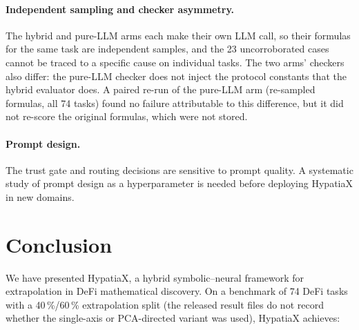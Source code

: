 \documentclass[twoside,11pt]{article}
\begin{document}
\paragraph{Independent sampling and checker asymmetry.}
The hybrid and pure-LLM arms each make their own LLM call, so their formulas
for the same task are independent samples, and the 23 uncorroborated cases
cannot be traced to a specific cause on individual tasks. The two arms' checkers also differ:
the pure-LLM checker does not inject the protocol constants that the hybrid
evaluator does. A paired re-run of the pure-LLM arm (re-sampled formulas, all
74 tasks) found no failure attributable to this difference, but it did not
re-score the original formulas, which were not stored.

\paragraph{Prompt design.}
The trust gate and routing decisions are sensitive to prompt quality.  A systematic
study of prompt design as a hyperparameter is needed before deploying HypatiaX
in new domains.

\section{Conclusion}
\label{sec:conclusion}

We have presented HypatiaX, a hybrid symbolic--neural framework for extrapolation
in DeFi mathematical discovery.  On a benchmark of 74 DeFi tasks with a 40\,\%/60\,\% extrapolation split (the released result files do not record whether the single-axis or PCA-directed variant was used), HypatiaX achieves:
\end{document}
